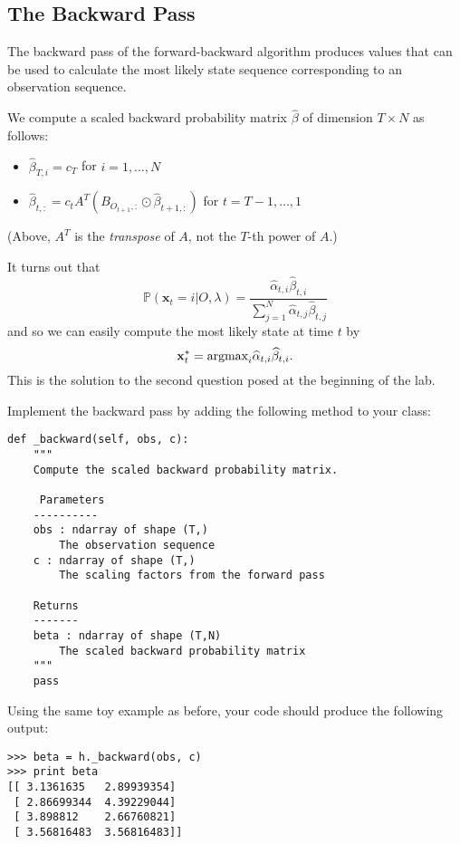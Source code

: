 \subsection*{The Backward Pass}
The backward pass of the forward-backward algorithm produces values that can be used to calculate the most likely state sequence corresponding to an observation sequence.

We compute a scaled backward probability matrix $\widehat{\beta}$ of dimension $T \times N$ as follows:
\begin{itemize}
 \item $\widehat{\beta}_{T,i} = c_{T}$ for $i = 1,\ldots, N$
 \item $\widehat{\beta}_{t,:} = c_{t}A^T(B_{O_{t+1},:}\odot \widehat{\beta}_{t+1,:})$ for $t = T-1, \ldots, 1$
\end{itemize}
(Above, $A^T$ is the \emph{transpose} of $A$, not the $T$-th power of $A$.)

It turns out that
\begin{equation*}
\mathbb{P}(\mathbf{x}_{t} = i | O, \lambda) = \frac{\widehat{\alpha}_{t,i}\widehat{\beta}_{t,i}}{\sum_{j=1}^{N} \widehat{\alpha}_{t,j}\widehat{\beta}_{t,j}}
\end{equation*}
and so we can easily compute the most likely state at time $t$ by
\begin{equation*}
\mathbf{x}_{t}^{*} = \mbox{argmax}_{i} \widehat{\alpha}_{t,i} \widehat{\beta}_{t,i}.
\end{equation*}
This is the solution to the second question posed at the beginning of the lab.

\begin{problem}
Implement the backward pass by adding the following method to your class:
\begin{lstlisting}
def _backward(self, obs, c):
    """
    Compute the scaled backward probability matrix.

     Parameters
    ----------
    obs : ndarray of shape (T,)
        The observation sequence
    c : ndarray of shape (T,)
        The scaling factors from the forward pass

    Returns
    -------
    beta : ndarray of shape (T,N)
        The scaled backward probability matrix
    """
    pass
\end{lstlisting}
Using the same toy example as before, your code should produce the following output:
\begin{lstlisting}
>>> beta = h._backward(obs, c)
>>> print beta
[[ 3.1361635   2.89939354]
 [ 2.86699344  4.39229044]
 [ 3.898812    2.66760821]
 [ 3.56816483  3.56816483]]
\end{lstlisting}
\end{problem}

